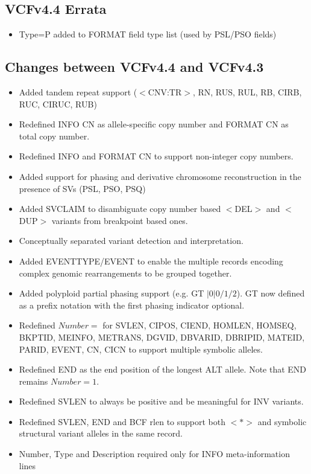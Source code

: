 \documentclass[8pt]{article}
\begin{document}
\subsection{VCFv4.4 Errata}

\begin{itemize}
	\item Type=P added to FORMAT field type list (used by PSL/PSO fields)
\end{itemize}

\subsection{Changes between VCFv4.4 and VCFv4.3}

\begin{itemize}
\item Added tandem repeat support ($<$CNV:TR$>$, RN, RUS, RUL, RB, CIRB, RUC, CIRUC, RUB)
\item Redefined INFO CN as allele-specific copy number and FORMAT CN as total copy number.
\item Redefined INFO and FORMAT CN to support non-integer copy numbers.
\item Added support for phasing and derivative chromosome reconstruction in the presence of SVs (PSL, PSO, PSQ)
\item Added SVCLAIM to disambiguate copy number based $<$DEL$>$ and $<$DUP$>$ variants from breakpoint based ones.
\item Conceptually separated variant detection and interpretation.
\item Added EVENTTYPE/EVENT to enable the multiple records encoding complex genomic rearrangements to be grouped together.
\item Added polyploid partial phasing support (e.g. GT $|0|0/1/2$). GT now defined as a prefix notation with the first phasing indicator optional.
\item Redefined $Number=$ for SVLEN, CIPOS, CIEND, HOMLEN, HOMSEQ, BKPTID, MEINFO, METRANS, DGVID, DBVARID, DBRIPID, MATEID, PARID, EVENT, CN, CICN to support multiple symbolic alleles.
\item Redefined END as the end position of the longest ALT allele. Note that END remains $Number=1$.
\item Redefined SVLEN to always be positive and be meaningful for INV variants.
\item Redefined SVLEN, END and BCF rlen to support both $<*>$ and symbolic structural variant alleles in the same record.
\item Number, Type and Description required only for INFO meta-information lines

\end{itemize}
\end{document}
